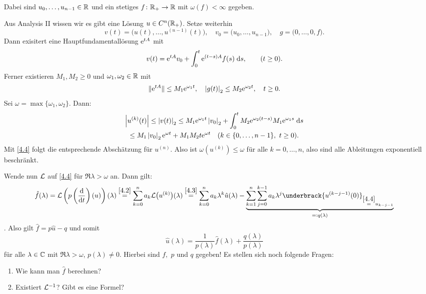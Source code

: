 \documentclass[a4paper,twoside,DIV15,BCOR12mm]{scrbook}
\begin{document}
Dabei sind $u_0,\dotsc,u_{n-1}\in\mathbb{R}$ und ein stetiges $f\colon\mathbb{R}_+\to\mathbb{R}$ mit $\omega(f)<\infty$ gegeben.

Aus Analysis II wissen wir es gibt eine Lösung $u\in C^n(\mathbb{R}_+)$. Setze weiterhin
\[v(t)=\bigl(u(t),\dotsc,u^{(n-1)}(t)\bigr),\quad v_0=\bigl(u_0,\dotsc,u_{n-1}\bigr),\quad g=\bigl(0,\dotsc,0,f\bigr).\]
Dann exisitert eine Hauptfundamentallösung $\mathrm{e}^{tA}$ mit
\[v(t) = \mathrm{e}^{tA}v_0+\int_{0}^{t}{\mathrm{e}^{(t-s)A}f(s)}\;\mathrm{d} s,\qquad(t\geq0).\]
Ferner existieren $M_1,M_2\geq 0$ und $\omega_1,\omega_2\in\mathbb{R}$ mit
\[\|\mathrm{e}^{tA}\|\leq M_1\mathrm{e}^{\omega_1 t},\quad\left\lvert g(t)\right\lvert_2\leq M_2\mathrm{e}^{\omega_2t},\quad t\geq0.\]
Sei $\omega = \max\{\omega_1,\omega_2\}$. Dann:
\begin{multline*}
\left\lvert u^{(k)}(t)\right\lvert\leq\left\lvert v(t)\right\lvert_2\leq M_1\mathrm{e}^{\omega_1t}\left\lvert v_0\right\lvert_2+\int_{0}^{t}{M_2\mathrm{e}^{\omega_2(t-s)}M_1\mathrm{e}^{\omega_1s}}\;\mathrm{d} s\\
\leq M_1\left\lvert v_0\right\lvert_2\mathrm{e}^{\omega t}+M_1M_2t\mathrm{e}^{\omega t}\quad(k\in\{0,\dotsc,n-1\},\ t\geq0).
\end{multline*}
Mit \eqref{4.4} folgt die entsprechende Abschätzung für $u^{(n)}$. Also ist $\omega(u^{(k)})\leq\omega$ für alle $k=0,\dotsc,n$, also sind alle Ableitungen exponentiell beschränkt.

Wende nun $\mathcal{L}$ auf \eqref{4.4} für $\Re{\lambda}>\omega$ an. Dann gilt:
\[\hat{f}(\lambda) = \L\left(p\left(\frac{\d}{\d t}\right)(u)\right)(\lambda)\overset{\eqref{4.2}}{=}\sum_{k=0}^na_k\L\bigl(u^{(k)}\bigr)(\lambda)
\overset{\eqref{4.3}}{=} \sum_{k=0}^na_k\lambda^k\hat{u}(\lambda) - \underbrace{\sum_{k=1}^n\sum_{j=0}^{k-1}a_k\lambda^j\underbrack{u^{(k-j-1)}(0)}_{\overset{\eqref{4.4}}{=}u_{k-j-1}}}_{\ad q(\lambda)}\].
Also gilt $\hat{f} = p\hat{u} - q$ und somit
\begin{equation}\label{4.5}
\hat{u}(\lambda) = \frac{1}{p(\lambda)}\hat{f}(\lambda) + \frac{q(\lambda)}{p(\lambda)}
\end{equation}
für alle $\lambda\in\mathbb{C}$ mit $\Re{\lambda}>\omega$, $p(\lambda)\neq 0$. Hierbei sind $f,$ $p$ und $q$ gegeben!
Es stellen sich noch folgende Fragen:
\begin{enumerate}[label=\arabic*)]
\item Wie kann man $\hat{f}$ berechnen?
\item Existiert $\mathcal{L}^{-1}$? Gibt es eine Formel?
\end{enumerate}
\end{document}
